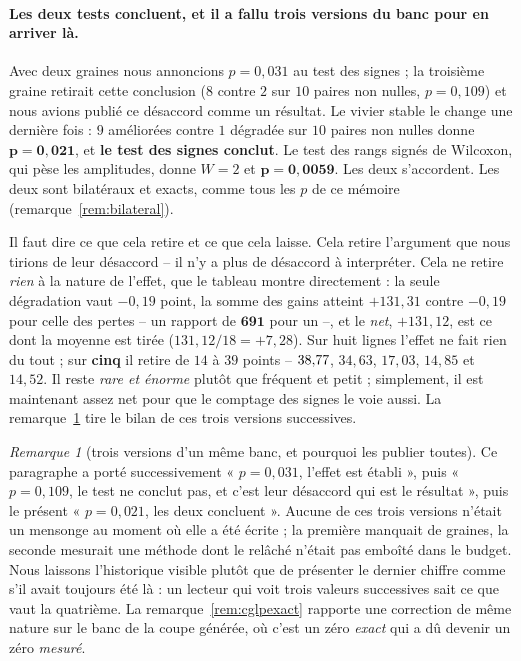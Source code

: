 \documentclass[11pt,a4paper]{article}
\theoremstyle{plain}
\theoremstyle{remark}
\newtheorem{remark}{Remarque}
\begin{document}
\paragraph{Les deux tests concluent, et il a fallu trois versions du banc
pour en arriver là.} Avec deux graines nous annoncions $p=0{,}031$ au test
des signes ; la troisième graine retirait cette conclusion ($8$ contre $2$
sur $10$ paires non nulles, $p=0{,}109$) et nous avions publié ce désaccord
comme un résultat. Le vivier stable le change une dernière fois : $9$
améliorées contre $1$ dégradée sur $10$ paires non nulles donne
$\mathbf{p=0{,}021}$, et \textbf{le test des signes conclut}. Le test des
rangs signés de Wilcoxon, qui pèse les amplitudes, donne $W=2$ et
$\mathbf{p=0{,}0059}$. Les deux s'accordent. Les deux sont bilatéraux et
exacts, comme tous les $p$ de ce mémoire (remarque~\ref{rem:bilateral}).

Il faut dire ce que cela retire et ce que cela laisse. Cela retire
l'argument que nous tirions de leur désaccord -- il n'y a plus de désaccord
à interpréter. Cela ne retire \emph{rien} à la nature de l'effet, que le
tableau montre directement : la seule dégradation vaut $-0{,}19$ point,
la somme des gains atteint $+131{,}31$ contre $-0{,}19$ pour celle des
pertes -- un rapport de $\mathbf{691}$ pour un --, et le \emph{net},
$+131{,}12$, est ce dont la moyenne est tirée ($131{,}12/18=+7{,}28$). Sur
huit lignes l'effet ne fait rien du tout ; sur \textbf{cinq} il retire de
$14$ à $39$ points -- $38{,}77{}$, $34{,}63$, $17{,}03$, $14{,}85$ et
$14{,}52$. Il reste \emph{rare et énorme} plutôt que fréquent et petit ;
simplement, il est maintenant assez net pour que le comptage des signes le
voie aussi. La remarque~\ref{rem:troisversions} tire le bilan de ces trois
versions successives.

\begin{remark}[trois versions d'un même banc, et pourquoi les publier toutes]
\label{rem:troisversions}
Ce paragraphe a porté successivement « $p=0{,}031$, l'effet est établi »,
puis « $p=0{,}109$, le test ne conclut pas, et c'est leur désaccord qui est
le résultat », puis le présent « $p=0{,}021$, les deux concluent ». Aucune
de ces trois versions n'était un mensonge au moment où elle a été écrite ;
la première manquait de graines, la seconde mesurait une méthode dont le
relâché n'était pas emboîté dans le budget. Nous laissons l'historique
visible plutôt que de présenter le dernier chiffre comme s'il avait toujours
été là : un lecteur qui voit trois valeurs successives sait ce que vaut la
quatrième. La remarque~\ref{rem:cglpexact} rapporte une correction de même
nature sur le banc de la coupe générée, où c'est un zéro \emph{exact} qui a
dû devenir un zéro \emph{mesuré}.
\end{remark}
\end{document}
